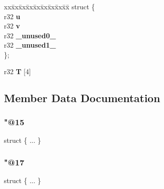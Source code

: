 \begin{DoxyCompactItemize}
\begin{tabbing}
\end{tabbing}\item 
\mbox{\label{unionv4_a6c5fc4d98ee39162e896982ff8ed9ec9}} 
\begin{tabbing}
xx\=xx\=xx\=xx\=xx\=xx\=xx\=xx\=xx\=\kill
struct \{\\
\mbox{\label{unionv4_aa591889b5cbcb1c0eb42d8ebedd66f85}} 
r32 {\bfseries u}\\
\mbox{\label{unionv4_a74d77988cbf1680dffbda67e5ed8fdc3}} 
r32 {\bfseries v}\\
\mbox{\label{unionv4_ae8a550e94fe7cf1e1a758e410d7f1f97}} 
r32 {\bfseries \_unused0\_}\\
\mbox{\label{unionv4_aa0363ef1c9d1c28b7eb7dbdafbc84df1}} 
r32 {\bfseries \_unused1\_}\\
\}; \\

\end{tabbing}\item 
\mbox{\label{unionv4_a687f6cd845ea4e01e555d494d965a04c}} 
r32 {\bfseries T} \mbox{[}4\mbox{]}
\end{DoxyCompactItemize}


\subsection{Member Data Documentation}
\mbox{\label{unionv4_a963bc0946c0501381cd328461d5dbf99}} 
\subsubsection{\texorpdfstring{"@15}{@15}}
{\footnotesize\ttfamily struct \{ ... \} }

\mbox{\label{unionv4_aaf52d9980c797b6b3d980647e037b8bb}} 
\subsubsection{\texorpdfstring{"@17}{@17}}
{\footnotesize\ttfamily struct \{ ... \} }

\mbox{\label{unionv4_a6c5fc4d98ee39162e896982ff8ed9ec9}} 
